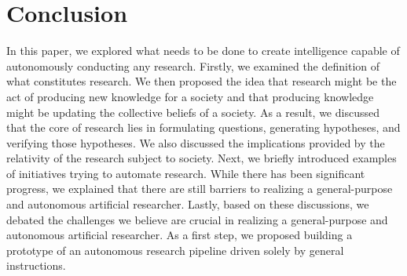 \section{Conclusion}
In this paper, we explored what needs to be done to create intelligence capable of autonomously conducting any research. Firstly, we examined the definition of what constitutes research. We then proposed the idea that research might be the act of producing new knowledge for a society and that producing knowledge might be updating the collective beliefs of a society. As a result, we discussed that the core of research lies in formulating questions, generating hypotheses, and verifying those hypotheses. We also discussed the implications provided by the relativity of the research subject to society. Next, we briefly introduced examples of initiatives trying to automate research. While there has been significant progress, we explained that there are still barriers to realizing a general-purpose and autonomous artificial researcher. Lastly, based on these discussions, we debated the challenges we believe are crucial in realizing a general-purpose and autonomous artificial researcher. As a first step, we proposed building a prototype of an autonomous research pipeline driven solely by general instructions.